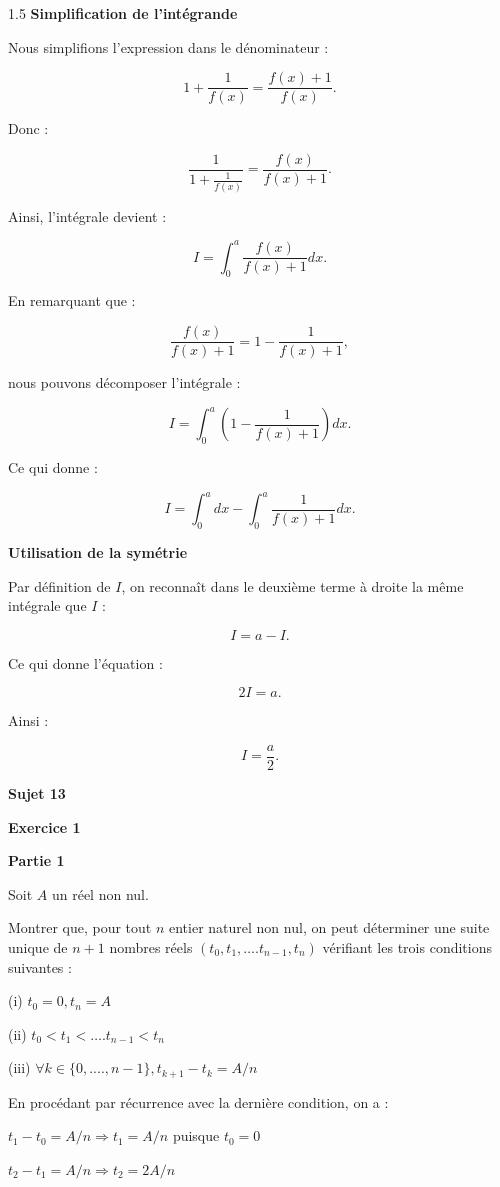 \documentclass[12pt]{article}
\begin{document}
\begin{spacing}{1.5}
\textbf{ Simplification de l'intégrande}

Nous simplifions l'expression dans le dénominateur :

\[
1 + \frac{1}{f(x)} = \frac{f(x)+1}{f(x)}.
\]

Donc :

\[
\frac{1}{1+\frac{1}{f(x)}} = \frac{f(x)}{f(x)+1}.
\]

Ainsi, l'intégrale devient :

\[
I = \int_0^a \frac{f(x)}{f(x)+1}dx.
\]

En remarquant que :

\[
\frac{f(x)}{f(x)+1} = 1 - \frac{1}{f(x)+1},
\]

nous pouvons décomposer l'intégrale :

\[
I = \int_0^a \left( 1 - \frac{1}{f(x)+1} \right) dx.
\]

Ce qui donne :

\[
I = \int_0^a dx - \int_0^a \frac{1}{f(x)+1}dx.
\]

\textbf{ Utilisation de la symétrie}

Par définition de $I$, on reconnaît dans le deuxième terme à droite la même intégrale que $I$ :

\[
I = a - I.
\]

Ce qui donne l'équation :

\[
2I = a.
\]

Ainsi :

\[
I = \frac{a}{2}.
\]


 

\medskip\textbf{Sujet 13}

\textbf{Exercice 1}

\textbf{Partie 1}

Soit $A$ un réel non nul. 

Montrer que, pour tout $n$ entier naturel non nul, on peut déterminer une suite unique de $n+1$ 
nombres réels $(t_0, t_1, ….t_{n-1},t_n)$ vérifiant les trois conditions suivantes : 

(i)    $t_0 = 0, t_n = A$ 

(ii)   $t_0 < t_1 < ….t_{n-1} < t_n$

(iii)  $\forall k\in \lbrace 0, ...., n-1\rbrace, t_{k+1}-t_{k}= A/n$

En procédant par récurrence avec la dernière condition, on a :

$t_{1}-t_{0}= A/n\Rightarrow t_1=A/n$ puisque $t_0=0$

$t_2-t_1=A/n \Rightarrow t_2=2A/n$


\end{spacing}
\end{document}
